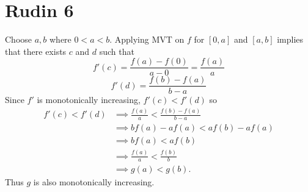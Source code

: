 \documentclass{article}
\begin{document}
\section*{Rudin 6}
Choose $a,b$ where $0 < a < b$.
Applying MVT on $f$ for $[0,a]$ and $[a,b]$ implies that there exists $c$ and $d$ such that
\[
	f'(c) = \frac{f(a) - f(0)}{a-0} = \frac{f(a)}{a}
\]
\[
	f'(d) = \frac{f(b) - f(a)}{b-a}
\]
Since $f'$ is monotonically increasing, $f'(c) < f'(d)$ so 
\begin{align*}
	f'(c) < f'(d) &\implies \frac{f(a)}{a} < \frac{f(b) - f(a)}{b-a} \\
	&\implies bf(a) - af(a) < af(b) - af(a) \\
	&\implies bf(a) < af(b) \\
	&\implies \frac{f(a)}{a} < \frac{f(b)}{b} \\
	&\implies g(a) < g(b).
\end{align*}
Thus $g$ is also monotonically increasing.



\newpage 
\end{document}
